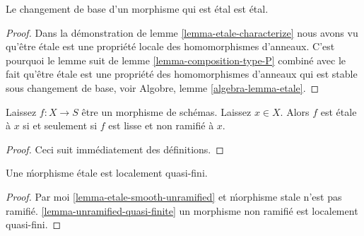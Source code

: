 \begin{lemma}

\label{lemma-base-change-etale}
Le changement de base d'un morphisme qui est \'etal est \'etal.
\end{lemma}

\begin{proof}
Dans la démonstration de lemme \ref{lemma-etale-characterize} nous avons vu qu'être \'etale est une propriété locale des homomorphismes d'anneaux. C'est pourquoi le lemme suit de lemme \ref{lemma-composition-type-P} combiné avec le fait qu'être \'etale est une propriété des homomorphismes d'anneaux qui est stable sous changement de base, voir Algobre, lemme \ref{algebra-lemma-etale}.
\end{proof}

\begin{lemma}

\label{lemma-etale-smooth-unramified}
Laissez $f : X \to S$ être un morphisme de schémas. Laissez $x \in X$. Alors $f$ est \'etale à $x$ si et seulement si $f$ est lisse et non ramifié à $x$.
\end{lemma}

\begin{proof}
Ceci suit immédiatement des définitions.
\end{proof}

\begin{lemma}

\label{lemma-etale-locally-quasi-finite}

Une \'morphisme étale est localement quasi-fini.

\end{lemma}

\begin{proof}

Par moi \ref{lemma-etale-smooth-unramified}
et \'morphisme stale n'est pas ramifié. \ref{lemma-unramified-quasi-finite}
un morphisme non ramifié est localement quasi-fini.

\end{proof}

